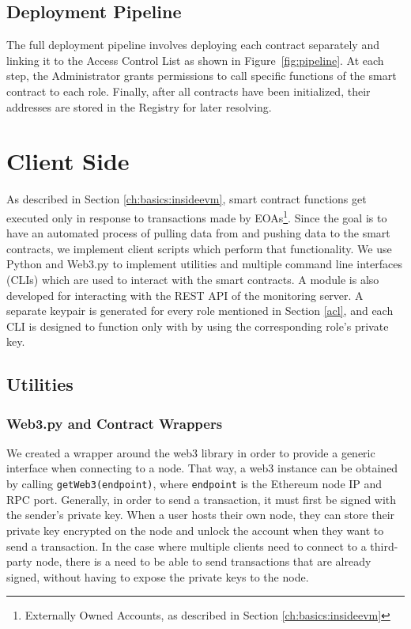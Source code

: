 \subsection{Deployment Pipeline}

The full deployment pipeline involves deploying each contract separately and linking it to the Access Control List as shown in Figure~\ref{fig:pipeline}. At each step, the Administrator grants permissions to call specific functions of the smart contract to each role. Finally, after all contracts have been initialized, their addresses are stored in the Registry for later resolving.




\section{Client Side} \label{ch:implementation:client}

As described in Section \ref{ch:basics:insideevm}, smart contract functions get executed only in response to transactions made by EOAs\footnote{Externally Owned Accounts, as described in Section \ref{ch:basics:insideevm}}. Since the goal is to have an automated process of pulling data from and pushing data to the smart contracts, we implement client scripts which perform that functionality. We use Python and Web3.py to implement utilities and multiple command line interfaces (CLIs) which are used to interact with the smart contracts. A module is also developed for interacting with the REST API of the monitoring server. A separate keypair is generated for every role mentioned in Section \ref{acl}, and each CLI is designed to function only with by using the corresponding role's private key.

\subsection{Utilities} \label{utils}

\subsubsection*{Web3.py and Contract Wrappers}
We created a wrapper around the web3 library in order to provide a generic interface when connecting to a node. That way, a web3 instance can be obtained by calling \texttt{getWeb3(endpoint)}, where \texttt{endpoint} is the Ethereum node IP and RPC port. Generally, in order to send a transaction, it must first be signed with the sender's private key. When a user hosts their own node, they can store their private key encrypted on the node and unlock the account when they want to send a transaction. In the case where multiple clients need to connect to a third-party node, there is a need to be able to send transactions that are already signed, without having to expose the private keys to the node.

